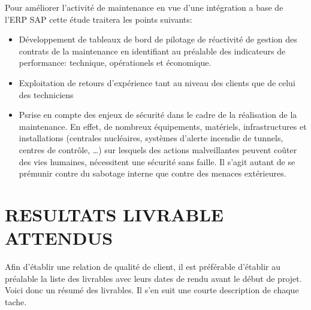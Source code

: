 \documentclass[]{scrartcl}
\begin{document}
\begin{itemize}
Pour améliorer l'activité de maintenance en vue d'une intégration a base de l'ERP SAP cette étude traitera les points suivants: 
\begin{itemize}
\item Développement de tableaux de bord de pilotage de réactivité de gestion des contrats de
la maintenance en identifiant au préalable des indicateurs de performance: technique, opérationels et économique.
\item Exploitation de retours d’expérience tant au niveau des clients que de celui des techniciens
\item Psrise en compte des enjeux de sécurité dans le cadre de la réalisation de la maintenance.
En effet, de nombreux équipements, matériels, infrastructures et installations (centrales
nucléaires, systèmes d’alerte incendie de tunnels, centres de contrôle, …) sur lesquels
des actions malveillantes peuvent coûter des vies humaines, nécessitent une sécurité sans
faille. Il s’agit autant de se prémunir contre du sabotage interne que contre des menaces
extérieures. 
\end{itemize}

\newpage
\section{RESULTATS LIVRABLE ATTENDUS}
Afin d'établir une relation de qualité de client, il est préférable d'établir au préalable la liste des livrables avec leurs dates de rendu avant le début de projet. Voici donc un résumé des livrables. Il s'en suit une courte description de chaque tache. 

\end{itemize}
\end{document}

